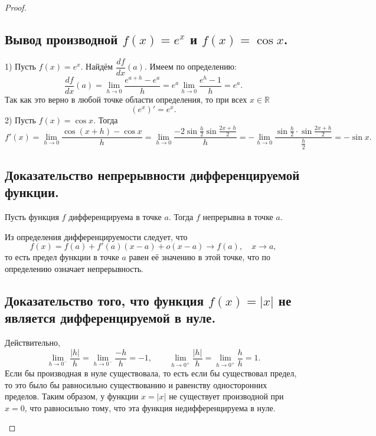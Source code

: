 \begin{proof}
    \subsection*{Вывод производной $f(x) = e^x$ и $f(x) = \cos x$.}
    \begin{note}[amber]
        \begin{note}[purple]
            1) Пусть $f(x)=e^x$. Найдём $\dfrac{df}{dx}(a)$. Имеем по определению:
            \[
            \frac{df}{dx}(a)=\lim_{h\to 0}\frac{e^{a+h}-e^a}{h}
            = e^a \lim_{h\to 0}\frac{e^h-1}{h}
            = e^a.
            \]
            Так как это верно в любой точке области определения, то при всех $x \in \mathbb{R}$
            \[
            (e^x)' = e^x.
            \]
            2) Пусть $f(x)=\cos x$. Тогда
            \[
            f'(x)=\lim_{h\to 0}\frac{\cos(x+h)-\cos x}{h}
            = \lim_{h\to 0}\frac{-2\sin\frac{h}{2}\sin\frac{2x+h}{2}}{h}
            = - \lim_{h\to 0}\frac{\sin\frac{h}{2} \cdot \sin\frac{2x+h}{2}}{\frac{h}{2}}
            = -\sin x.
            \]
        \end{note}
    \end{note}

    \subsection*{Доказательство непрерывности дифференцируемой функции.}
    \begin{note}[amber]
        Пусть функция $f$ дифференцируема в точке $a$. Тогда $f$ непрерывна в точке $a$.
        \begin{note}[purple]
            Из определения дифференцируемости следует, что
            \[
            f(x)=f(a)+f'(a)(x-a)+o(x-a)\to f(a), \quad x\to a,
            \]
            то есть предел функции в точке $a$ равен её значению в этой точке, что по определению означает непрерывность.
        \end{note}
    \end{note}

    \subsection*{Доказательство того, что функция $f(x) = |x|$ не является дифференцируемой в нуле.}
    \begin{note}[amber]
        \begin{note}[purple]
            Действительно,
            \[
            \lim_{h\to 0^-}\frac{|h|}{h}=\lim_{h\to 0^-}\frac{-h}{h}=-1,
            \qquad
            \lim_{h\to 0^+}\frac{|h|}{h}=\lim_{h\to 0^+}\frac{h}{h}=1.
            \]
            Если бы производная в нуле существовала, то есть если бы существовал предел, то это было бы равносильно существованию и равенству односторонних пределов. 
            Таким образом, у функции $x=|x|$ не существует производной при $x=0$, что равносильно тому, что эта функция недифференцируема в нуле.
        \end{note}
    \end{note}
\end{proof}
